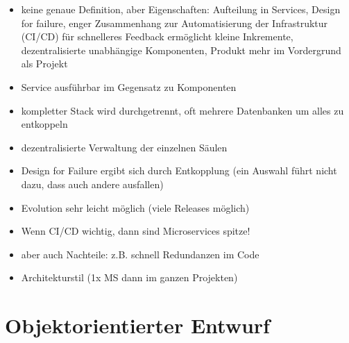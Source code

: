 \documentclass[paper=a4, fontsize=11pt]{scrartcl} %
\numberwithin{equation}{section} %
\numberwithin{figure}{section} %
\numberwithin{table}{section} %
\begin{document}
\begin{itemize}
  \item keine genaue Definition, aber Eigenschaften: Aufteilung in Services, Design for failure, enger Zusammenhang zur Automatisierung der Infrastruktur (CI/CD) für schnelleres Feedback ermöglicht kleine Inkremente, dezentralisierte unabhängige Komponenten, Produkt mehr im Vordergrund als Projekt
  \item Service ausführbar im Gegensatz zu Komponenten
  \item kompletter Stack wird durchgetrennt, oft mehrere Datenbanken um alles zu entkoppeln
  \item dezentralisierte Verwaltung der einzelnen Säulen
  \item Design for Failure ergibt sich durch Entkopplung (ein Auswahl führt nicht dazu, dass auch andere ausfallen)
  \item Evolution sehr leicht möglich (viele Releases möglich)
  \item Wenn CI/CD wichtig, dann sind Microservices spitze!
  \item aber auch Nachteile: z.B. schnell Redundanzen im Code
  \item Architekturstil (1x MS dann im ganzen Projekten)
\end{itemize}

\section{Objektorientierter Entwurf}
\end{document}
